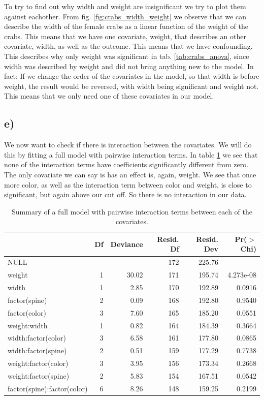 \documentclass[a4paper,norsk, 10pt]{article}
\begin{document}
To try to find out why width and weight are insignificant we try to plot them against eachother. From fig. \ref{fig:crabs_width_weight} we observe that we can describe the width of the female crabs as a linear function of the weight of the crabs. This means that we have one covariate, weight, that describes an other covariate, width, as well as the outcome. This means that we have confounding. This describes why only weight was significant in tab. \ref{tab:crabs_anova}, since width was described by weight and did not bring anything new to the model. In fact: If we change the order of the covariates in the model, so that width is before weight, the result would be reversed, with width being significant and weight not. This means that we only need one of these covariates in our model. 

\subsection{e)}
We now want to check if there is interaction between the covariates. We will do this by fitting a full model with pairwise interaction terms. In table \ref{tab:crabs_interaction} we see that none of the interaction terms have coefficients significantly different from zero. The only covariate we can say is has an effect is, again, weight. We see that once more color, as well as the interaction term between color and weight, is close to significant, but again above our cut off. So there is no interaction in our data. 	

\begin{table}[ht]
\centering
\begin{tabular}{lrrrrr}
  \hline
 & Df & Deviance & Resid. Df & Resid. Dev & Pr($>$Chi) \\ 
  \hline
NULL &  &  & 172 & 225.76 &  \\ 
  weight & 1 & 30.02 & 171 & 195.74 & 4.273e-08 \\ 
  width & 1 & 2.85 & 170 & 192.89 & 0.0916 \\ 
  factor(spine) & 2 & 0.09 & 168 & 192.80 & 0.9540 \\ 
  factor(color) & 3 & 7.60 & 165 & 185.20 & 0.0551 \\ 
  weight:width & 1 & 0.82 & 164 & 184.39 & 0.3664 \\ 
  width:factor(color) & 3 & 6.58 & 161 & 177.80 & 0.0865 \\ 
  width:factor(spine) & 2 & 0.51 & 159 & 177.29 & 0.7738 \\ 
  weight:factor(color) & 3 & 3.95 & 156 & 173.34 & 0.2668 \\ 
  weight:factor(spine) & 2 & 5.83 & 154 & 167.51 & 0.0542 \\ 
  factor(spine):factor(color) & 6 & 8.26 & 148 & 159.25 & 0.2199 \\ 
   \hline
\end{tabular}
\caption{Summary of a full model with pairwise interaction terms between each of the covariates.}\label{tab:crabs_interaction}
\end{table}
\end{document}
